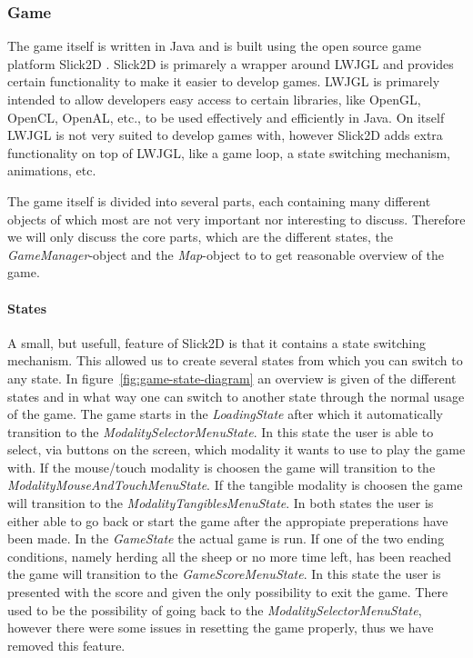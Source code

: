\documentclass[a4paper,10pt]{article}
\begin{document}
\subsubsection{Game}
The game itself is written in Java and is built using the open source game platform Slick2D \cite{Slick2D}.
Slick2D is primarely a wrapper around LWJGL \cite{LWJGL} and provides certain functionality to make it easier to develop games.
LWJGL is primarely intended to allow developers easy access to certain libraries, like OpenGL, OpenCL, OpenAL, etc., to be used effectively and efficiently in Java.
On itself LWJGL is not very suited to develop games with, however Slick2D adds extra functionality on top of LWJGL, like a game loop, a state switching mechanism, animations, etc.

The game itself is divided into several parts, each containing many different objects of which most are not very important nor interesting to discuss.
Therefore we will only discuss the core parts, which are the different states, the \emph{GameManager}-object and the \emph{Map}-object to to get reasonable overview of the game.

\paragraph{States}
A small, but usefull, feature of Slick2D is that it contains a state switching mechanism.
This allowed us to create several states from which you can switch to any state.
In figure~\ref{fig:game-state-diagram} an overview is given of the different states and in what way one can switch to another state through the normal usage of the game.
The game starts in the \emph{LoadingState} after which it automatically transition to the \emph{ModalitySelectorMenuState}.
In this state the user is able to select, via buttons on the screen, which modality it wants to use to play the game with.
If the mouse/touch modality is choosen the game will transition to the \emph{ModalityMouseAndTouchMenuState}.
If the tangible modality is choosen the game will transition to the \emph{ModalityTangiblesMenuState}.
In both states the user is either able to go back or start the game after the appropiate preperations have been made.
In the \emph{GameState} the actual game is run.
If one of the two ending conditions, namely herding all the sheep or no more time left, has been reached the game will transition to the \emph{GameScoreMenuState}.
In this state the user is presented with the score and given the only possibility to exit the game.
There used to be the possibility of going back to the \emph{ModalitySelectorMenuState}, however there were some issues in resetting the game properly, thus we have removed this feature.
\end{document}
